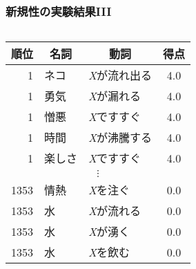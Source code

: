 \documentclass[12pt,usepdftitle=false]{beamer}
\newcommand\header[1]{\multicolumn{1}{c}{\textbf{#1}}}
\begin{document}
\begin{frame}
    \frametitle{新規性の実験結果III}
    \begin{columns}
        \begin{column}{0.6\textwidth}
            \begin{table}[t]
                \centering\footnotesize
                \begin{tabular}{rllc}
                    \toprule%
                    \header{順位} & \header{名詞} & \header{動詞} & \header{得点} \\
                    \midrule%
                    1             & ネコ          & \emph{X}が流れ出る   & 4.0           \\
                    1             & 勇気          & \emph{X}が漏れる     & 4.0           \\
                    1             & 憎悪          & \emph{X}ですすぐ     & 4.0           \\
                    1             & 時間          & \emph{X}が沸騰する   & 4.0           \\
                    1             & 楽しさ        & \emph{X}ですすぐ     & 4.0           \\[-1pt]
                    \multicolumn{4}{c}{$\vdots$} \\[2pt]
                    1353          & 情熱          & \emph{X}を注ぐ       & 0.0           \\
                    1353          & 水            & \emph{X}が流れる     & 0.0           \\
                    1353          & 水            & \emph{X}が湧く       & 0.0           \\
                    1353          & 水            & \emph{X}を飲む       & 0.0           \\

\end{tabular}
\end{table}
\end{column}
\end{columns}
\end{frame}
\end{document}
